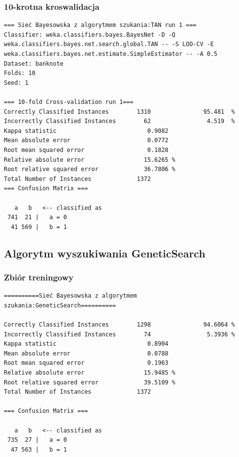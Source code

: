 \documentclass{classrep}
\begin{document}
\subsubsection*{10-krotna kroswalidacja}
\scriptsize 
\begin{verbatim}
=== Sieć Bayesowska z algorytmem szukania:TAN run 1 ===
Classifier: weka.classifiers.bayes.BayesNet -D -Q
weka.classifiers.bayes.net.search.global.TAN -- -S LOO-CV -E
weka.classifiers.bayes.net.estimate.SimpleEstimator -- -A 0.5
Dataset: banknote
Folds: 10
Seed: 1

=== 10-fold Cross-validation run 1===
Correctly Classified Instances        1310               95.481  %
Incorrectly Classified Instances        62                4.519  %
Kappa statistic                          0.9082
Mean absolute error                      0.0772
Root mean squared error                  0.1828
Relative absolute error                 15.6265 %
Root relative squared error             36.7806 %
Total Number of Instances             1372     
=== Confusion Matrix ===

   a   b   <-- classified as
 741  21 |   a = 0
  41 569 |   b = 1
\end{verbatim} 
\normalsize

\subsection{Algorytm wyszukiwania GeneticSearch}
\subsubsection*{Zbiór treningowy}
\scriptsize 
\begin{verbatim}
==========Sieć Bayesowska z algorytmem szukania:GeneticSearch==========

Correctly Classified Instances        1298               94.6064 %
Incorrectly Classified Instances        74                5.3936 %
Kappa statistic                          0.8904
Mean absolute error                      0.0788
Root mean squared error                  0.1963
Relative absolute error                 15.9485 %
Root relative squared error             39.5109 %
Total Number of Instances             1372     

=== Confusion Matrix ===

   a   b   <-- classified as
 735  27 |   a = 0
  47 563 |   b = 1
\end{verbatim} 
\normalsize
\end{document}
